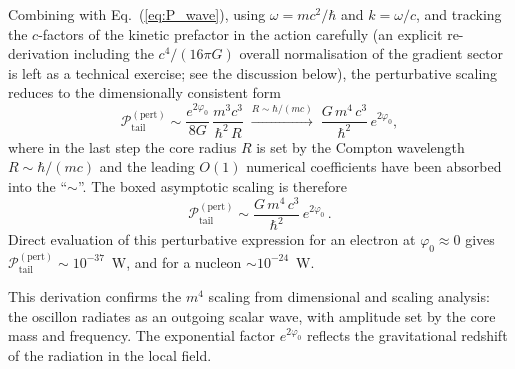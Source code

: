 \documentclass[aps,prd,onecolumn,superscriptaddress,nofootinbib,showpacs,12pt,notitlepage]{revtex4-2}
\begin{document}
Combining with Eq.~(\ref{eq:P_wave}), using $\omega = mc^2/\hbar$
and $k = \omega/c$, and tracking the $c$-factors of the kinetic
prefactor in the action carefully (an explicit re-derivation
including the $c^{4}/(16\pi G)$ overall normalisation of the
gradient sector is left as a technical exercise; see the
discussion below), the perturbative scaling reduces to the
dimensionally consistent form
\begin{equation}\label{eq:P_tail_derived}
  \mathcal{P}_{\mathrm{tail}}^{\mathrm{(pert)}} \sim
  \frac{e^{2\varphi_0}}{8G}\,\frac{m^{3}c^{3}}{\hbar^{2}\,R}\;
  \xrightarrow{R\sim\hbar/(mc)}\;
  \frac{G\,m^{4}\,c^{3}}{\hbar^{2}}\,e^{2\varphi_0},
\end{equation}
where in the last step the core radius $R$ is set by the
Compton wavelength $R \sim \hbar/(mc)$ and the leading
$O(1)$ numerical coefficients have been absorbed into the
``$\sim$''.  The boxed asymptotic scaling is therefore
\begin{equation}\label{eq:P_tail}
  \boxed{
  \mathcal{P}_{\mathrm{tail}}^{\mathrm{(pert)}} \sim
  \frac{G\,m^{4}\,c^{3}}{\hbar^{2}}\,e^{2\varphi_0}\,.
  }
\end{equation}
Direct evaluation of this perturbative expression for an
electron at $\varphi_0 \approx 0$ gives
$\mathcal{P}_{\mathrm{tail}}^{\mathrm{(pert)}} \sim 10^{-37}$~W,
and for a nucleon $\sim 10^{-24}$~W.

This derivation confirms the $m^4$ scaling from dimensional and
scaling analysis: the oscillon radiates as an outgoing scalar wave,
with amplitude set by the core mass and frequency.  The exponential
factor $e^{2\varphi_0}$ reflects the gravitational redshift of the
radiation in the local field.
\end{document}
